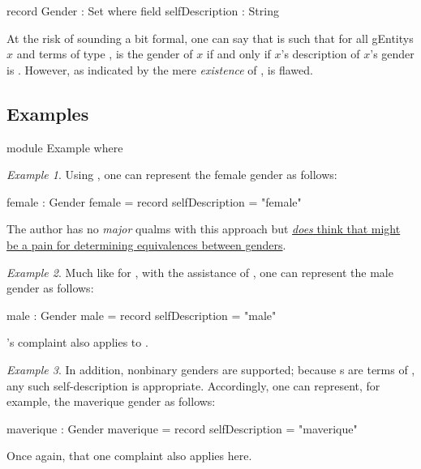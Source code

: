 \documentclass{article}
\theoremstyle{remark}
\newtheorem{example}{Example}
\begin{document}
\begin{code}
  record Gender : Set where
    field
      selfDescription : String
\end{code}

At the risk of sounding a bit formal, one can say that  is such that for all \glspl{gEntity} \(x\) and terms  of type ,  is the gender of \(x\) if and only if \(x\)'s description of \(x\)'s gender is  .  However, as indicated by the mere \emph{existence} of ,  is flawed.

\subsection{Examples}

\begin{code}
  module Example where
\end{code}

\begin{example}\label{example:gender1exampleFemale}
  Using , one can represent the female gender as follows:

  \begin{code}
    female : Gender
    female = record {selfDescription = "female"}
  \end{code}

  The author has no \emph{major} qualms with this approach but \hyperref[enum:gender1stringComparison]{\emph{does} think that  might be a pain for determining equivalences between genders}.
\end{example}

\begin{example}
  Much like for , with the assistance of , one can represent the male gender as follows:

  \begin{code}
    male : Gender
    male = record {selfDescription = "male"}
\end{code}

's  complaint also applies to .
\end{example}

\begin{example}
  In addition, nonbinary genders are supported; because s are terms of , any such self-description is appropriate.  Accordingly, one can represent, for example, the maverique gender\cite{nonbinaryWikiMaverique} as follows:

  \begin{code}
    maverique : Gender
    maverique = record {selfDescription = "maverique"}
  \end{code}

Once again, that one  complaint also applies here.
\end{example}
\end{document}

